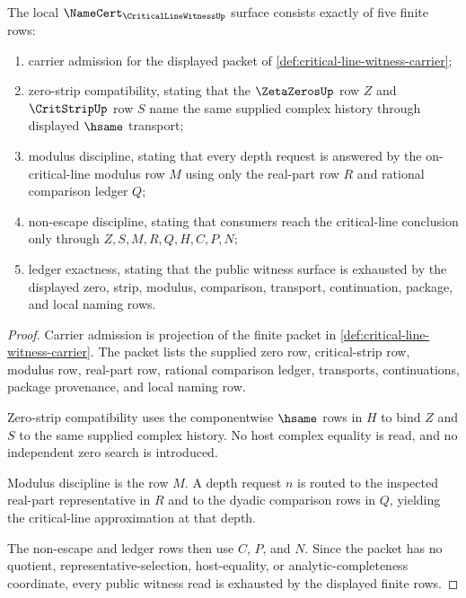 \begin{theorem}
\label{thm:critical-line-witness-namecert-obligations}
The local $\NameCert_{\CriticalLineWitnessUp}$ surface consists exactly of five finite rows:
\begin{enumerate}
\item carrier admission for the displayed packet of \autoref{def:critical-line-witness-carrier};
\item zero-strip compatibility, stating that the $\ZetaZerosUp$ row $Z$ and $\CritStripUp$ row $S$ name the same supplied complex history through displayed $\hsame$ transport;
\item modulus discipline, stating that every depth request is answered by the on-critical-line modulus row $M$ using only the real-part row $R$ and rational comparison ledger $Q$;
\item non-escape discipline, stating that consumers reach the critical-line conclusion only through $Z,S,M,R,Q,H,C,P,N$;
\item ledger exactness, stating that the public witness surface is exhausted by the displayed zero, strip, modulus, comparison, transport, continuation, package, and local naming rows.
\end{enumerate}
\end{theorem}
\begin{proof}
Carrier admission is projection of the finite packet in \autoref{def:critical-line-witness-carrier}. The packet lists the supplied zero row, critical-strip row, modulus row, real-part row, rational comparison ledger, transports, continuations, package provenance, and local naming row.

Zero-strip compatibility uses the componentwise $\hsame$ rows in $H$ to bind $Z$ and $S$ to the same supplied complex history. No host complex equality is read, and no independent zero search is introduced.

Modulus discipline is the row $M$. A depth request $n$ is routed to the inspected real-part representative in $R$ and to the dyadic comparison rows in $Q$, yielding the critical-line approximation at that depth.

The non-escape and ledger rows then use $C$, $P$, and $N$. Since the packet has no quotient, representative-selection, host-equality, or analytic-completeness coordinate, every public witness read is exhausted by the displayed finite rows.
\end{proof}

